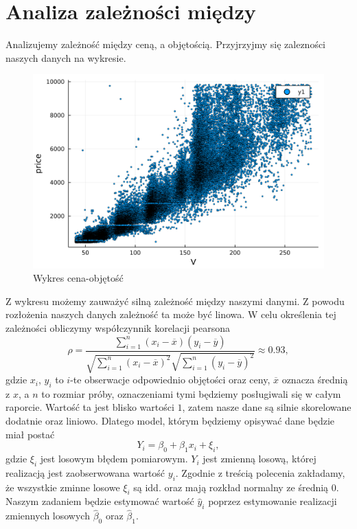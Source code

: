 \documentclass[12pt,leqno]{article}
\theoremstyle{exer}
\begin{document}
	\section{Analiza zależności między }
	Analizujemy zależność między ceną, a objętością. Przyjrzyjmy się zalezności naszych danych na wykresie.
	\begin{figure}[H]\label{fig:v_vs_price}\centering
		\includegraphics[width=4\columnwidth/5]{images/Budnik/v_vs_price.png}\caption{Wykres cena-objętość}
	\end{figure}
	Z wykresu możemy zauważyć silną zależność między naszymi danymi. Z powodu rozłożenia naszych danych zależność ta może być linowa. W celu określenia tej zależności obliczymy współczynnik korelacji pearsona
	\begin{equation}
		\rho=\frac{\sum_{i=1}^n\left(x_i-\overline{x}\right)\left(y_i-\overline{y}\right)}
		{\sqrt{\sum_{i=1}^n\left(x_i-\overline{x}\right)^2}\sqrt{\sum_{i=1}^n\left(y_i-\overline{y}\right)^2}}\approx0.93,
	\end{equation}
	gdzie $x_i$, $y_i$ to $i$-te obserwacje odpowiednio objętości oraz ceny, $\overline{x}$ oznacza średnią z $x$, a $n$ to rozmiar próby, oznaczeniami tymi będziemy posługiwali się w całym raporcie. Wartość ta jest blisko wartości $1$, zatem nasze dane są silnie skorelowane dodatnie oraz liniowo. Dlatego model, którym będziemy opisywać dane będzie miał postać
	\begin{equation}\label{eq:reg}
		Y_i=\beta_0+\beta_1x_i+\xi_i,
	\end{equation}
	gdzie $\xi_i$ jest losowym błędem pomiarowym. $Y_i$ jest zmienną losową, której realizacją jest zaobserwowana wartość $y_i$. Zgodnie z treścią polecenia zakładamy, że wszystkie zminne losowe $\xi_i$ są idd. oraz mają rozkład normalny ze średnią 0. Naszym zadaniem będzie estymować wartość $\hat y_i$ poprzez estymowanie realizacji zmiennych losowych $\hat \beta_0$ oraz $\hat\beta_1$.
\end{document}
